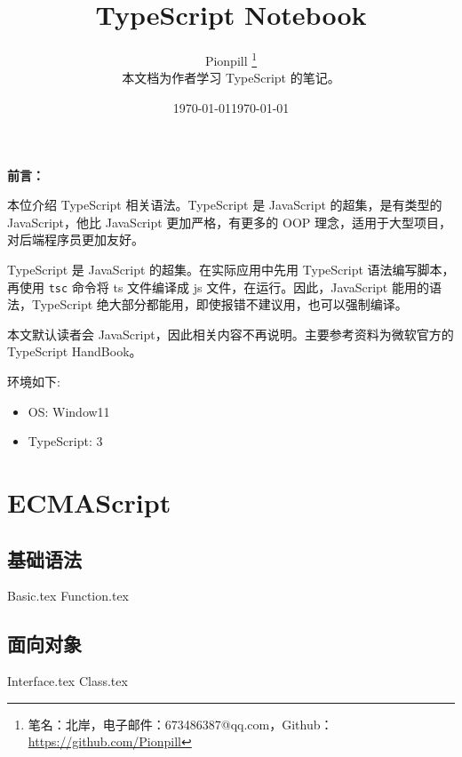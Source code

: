 \documentclass{PionpillNote-book}
\title{TypeScript Notebook}
\author{
    Pionpill \footnote{笔名：北岸，电子邮件：673486387@qq.com，Github：\url{https://github.com/Pionpill}} \\
    本文档为作者学习 TypeScript 的笔记。\\
}
\date{\today}
\begin{document}
\pagestyle{plain}
\maketitle

\noindent\textbf{前言：}

本位介绍 TypeScript 相关语法。TypeScript 是 JavaScript 的超集，是有类型的 JavaScript，他比 JavaScript 更加严格，有更多的 OOP 理念，适用于大型项目，对后端程序员更加友好。

TypeScript 是 JavaScript 的超集。在实际应用中先用 TypeScript 语法编写脚本，再使用 \texttt{tsc} 命令将 ts 文件编译成 js 文件，在运行。因此，JavaScript 能用的语法，TypeScript 绝大部分都能用，即使报错不建议用，也可以强制编译。

本文默认读者会 JavaScript，因此相关内容不再说明。主要参考资料为微软官方的 TypeScript HandBook。

环境如下:
\begin{itemize}
    \item OS: Window11
    \item TypeScript: 3
\end{itemize}

\date{\today}
\newpage

\tableofcontents

\newpage

\setcounter{page}{1} 
\pagestyle{fancy}

\part{ECMAScript}
\chapter{基础语法}
{Basic.tex}
{Function.tex}
\chapter{面向对象}
{Interface.tex}
{Class.tex}
\end{document}
